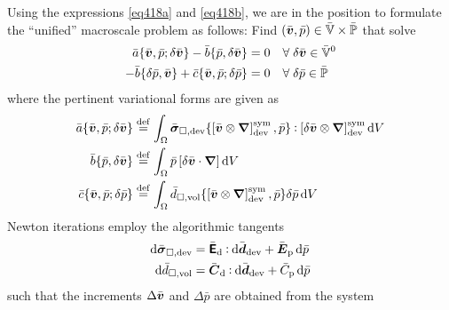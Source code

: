 \documentclass[10pt,a4paper]{article}
\newcommand{\ded}{\mathrm{d}}
\newcommand{\dep}{\mathrm{p}}
\begin{document}
Using the expressions \eqref{eq418a} and \eqref{eq418b}, we are in the position to formulate the ``unified'' macroscale problem as follows: Find $(\bar{\boldsymbol{v}},\bar p) \in\bar{\mathbb{V}}\times\bar{\mathbb{P}}$ that solve
\begin{align}
 \bar a\{\bar{\boldsymbol{v}},\bar p; \delta\bar{\boldsymbol{v}}\} - \bar b\{\bar p, \delta\bar{\boldsymbol{v}}\} &= 0   \quad \forall\; \delta\bar{\boldsymbol{v}} \in \bar{\mathbb{V}}^0
 \label{eq411a}\\
 - \bar b\{\delta\bar p, \bar{\boldsymbol{v}}\} + \bar c\{\bar{\boldsymbol{v}}, \bar p; \delta\bar p\}&= 0   \quad \forall\; \delta\bar p \in \bar{\mathbb{P}}
 \label{eq411b}
\end{align}
where the pertinent variational forms are given as
\begin{align}
 \bar a\{\bar{\boldsymbol{v}},\bar p; \delta\bar{\boldsymbol{v}}\} &\overset{\mathrm{def}}{=} \int_\Omega \bar{\boldsymbol{\sigma}}_{\Box,\mathrm{dev}}\{\left[\bar{\boldsymbol{v}}\mathbin{\otimes} \boldsymbol{\nabla}\right]^{\mathrm{sym}}_{\mathrm{dev}},\bar p\}\mathbin{\vcentcolon} \left[\delta\bar{\boldsymbol{v}}\mathbin{\otimes} \boldsymbol{\nabla}\right]^{\mathrm{sym}}_{\mathrm{dev}} \operatorname{d \!} V
 \label{eq412a}\\
 \bar b\{\bar p, \delta\bar{\boldsymbol{v}}\}             &\overset{\mathrm{def}}{=} \int_\Omega \bar p\left[\delta\bar{\boldsymbol{v}}\cdot\boldsymbol{\nabla}\right]\operatorname{d \!} V
 \label{eq412b}\\
 \bar c\{\bar{\boldsymbol{v}}, \bar p; \delta\bar p\}     &\overset{\mathrm{def}}{=} \int_\Omega \bar d_{\Box,\mathrm{vol}}\{\left[\bar{\boldsymbol{v}}\mathbin{\otimes} \boldsymbol{\nabla}\right]^{\mathrm{sym}}_{\mathrm{dev}},\bar p\}\delta\bar p\operatorname{d \!} V
 \label{eq412c}
\end{align}
Newton iterations employ the algorithmic tangents
\begin{align}
 \dif \bar{\ts\sigma}_{\Box,\dev} &= \bar{\tf E}_\ded \dprod \dif\bar{\ts d}_\dev + \bar{\ts E}_\dep \dif\bar{p}
 \label{eq413a} \\
 \dif \bar{d}_{\Box,\vol} &= \bar{\ts C}_\ded \dprod \dif \bar{\ts d}_\dev + \bar{C}_\dep \dif\bar{p}
 \label{eq413b}
\end{align}
such that the increments $\Delta\bar{\boldsymbol{v}}$ and $\Delta\bar{p}$ are obtained from the system
\end{document}
